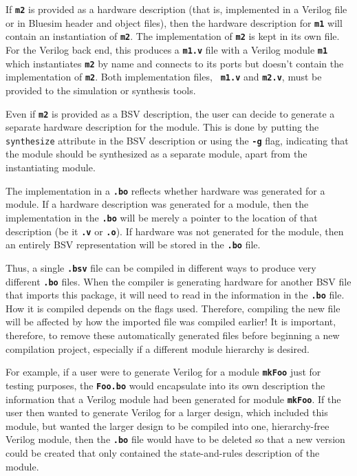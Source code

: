 \documentclass{article}
\newcommand{\te}[1]{\texttt{#1}}
\begin{document}
If {\bf\tt m2} is provided as a hardware
description (that is, implemented in a Verilog file or in Bluesim header and
object files), then the hardware description for {\bf\tt m1} will
contain an instantiation of {\bf\tt m2}.  The implementation of
{\bf\tt m2} is kept in its own file.
For the Verilog back end, this produces a {\bf\tt m1.v}
file with a Verilog module {\bf\tt m1} which instantiates {\bf\tt m2}
by name and connects to its ports but doesn't contain the
implementation of {\bf\tt m2}. Both implementation files, {\bf\tt
m1.v} and {\bf\tt m2.v}, must be provided to the simulation or
synthesis tools.

\index{-g@\te{-g} (compiler flag)}

Even if {\bf\tt m2} is provided as a BSV description, the user can
decide to generate a separate hardware description for the module.
This is done by putting the \te{synthesize} attribute in the BSV
description   or using the
{\bf\tt -g} flag, indicating that
 the module should be synthesized
as a separate module, apart from the instantiating module.

\index{.bo@\te{.bo} (file type)}
 The
implementation in a {\bf\tt .bo} reflects whether hardware was
generated for a module.  If a hardware description was generated for a
module, then the implementation in the {\bf\tt .bo} will be merely a
pointer to the location of that description (be it {\bf\tt .v} or
{\bf\tt .o}). If hardware was not generated for the module, then an
entirely BSV representation will be stored in the {\bf\tt .bo} file.

Thus, a single {\bf\tt .bsv} file can be compiled in different ways to
produce very different {\bf\tt .bo} files.  When the
compiler is generating hardware for another BSV file that imports this
package, it will need to read in the information in the {\bf\tt .bo}
file. How it is compiled depends on the flags used. Therefore, compiling the
new file will be affected by how the imported file was compiled earlier!  It
is important, therefore, to remove these automatically generated files
before beginning a new compilation project, especially if a different
module hierarchy is desired.

For example, if a user were to generate Verilog for a module {\bf\tt mkFoo}
just for testing purposes, the {\bf\tt Foo.bo} would encapsulate into its
own description the information that a Verilog module had been generated
for module {\bf\tt mkFoo}.  If the user then wanted to generate Verilog for a
larger design, which included this module, but wanted the larger design
to be compiled into one, hierarchy-free Verilog module, then the {\bf\tt .bo} file would
have to be deleted so that a new version could be created that only
contained the state-and-rules description of the module.
\end{document}
